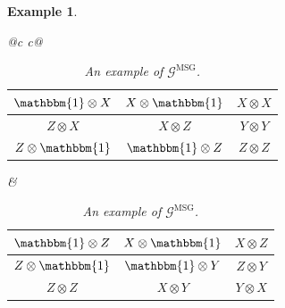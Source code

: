 \documentclass{article}
\newtheorem{example}{Example}
\begin{document}
\begin{example}
\begin{table}[ht]
\begin{tabular}{@{}c c@{}}
      \begin{tabular}{|c|c|c|}
        \hline
        $\mathbbm{1}\otimes X$ & $X \otimes \mathbbm{1}$ & $X \otimes X$ \\ \hline
        $Z\otimes X$ & $X \otimes Z$ & $Y \otimes Y$ \\ \hline
        $Z\otimes \mathbbm{1}$ & $\mathbbm{1}\otimes Z$ & $Z \otimes Z$ \\
        \hline
      \end{tabular}
      &
      \begin{tabular}{|c|c|c|}
        \hline
        $\mathbbm{1}\otimes Z$ & $X \otimes \mathbbm{1}$ & $X \otimes Z$ \\ \hline
        $Z\otimes \mathbbm{1}$ & $\mathbbm{1}\otimes Y$ & $Z \otimes Y$ \\ \hline
        $Z\otimes Z$ & $X \otimes Y$ & $Y \otimes X$ \\
        \hline
      \end{tabular}
      
    \end{tabular}
    \caption{An example of $\bm{\mathcal{G}}^{\text{MSG}}$.}
    \end{table}
\end{example}
\end{document}

